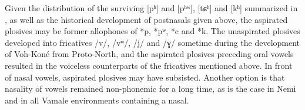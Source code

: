 Given the distribution of the surviving [pʰ] and [pʰʷ], [tɕʰ] and [kʰ] summarized in , as well as the historical development of postnasals given above, the aspirated plosives may be former allophones of *p, *pʷ, *c and *k. The unaspirated plosives developed into fricatives /v/, /vʷ/, /j/ and /ɣ/ sometime during the development of Voh-Koné from Proto-North, and the aspirated plosives preceding oral vowels resulted in the voiceless counterparts of the fricatives mentioned above. In front of nasal vowels, aspirated plosives may have subsisted. Another option is that nasality of vowels remained non-phonemic for a long time, as is the case in Nemi and in all Vamale environments containing a nasal.
	

	

	
